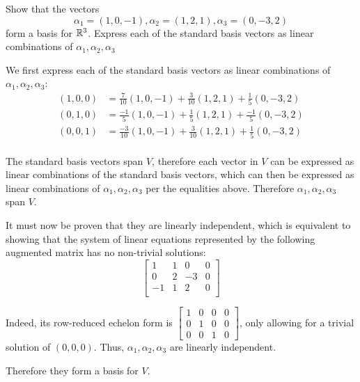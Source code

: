 \documentclass[a4paper, 11pt]{article}
\begin{document}
\begin{problem} 
Show that the vectors \[
    \alpha_1 = (1, 0, -1), \alpha_2 = (1, 2, 1), \alpha_3 = (0, -3, 2)
\]
form a basis for \(\mathbb{R}^3\). Express each of the standard basis vectors as linear combinations of \(\alpha_1, \alpha_2, \alpha_3\)
\end{problem}
\begin{solution}
    We first express each of the standard basis vectors as linear combinations of \(\alpha_1, \alpha_2, \alpha_3\):
    \begin{align*}
        (1, 0, 0) & = \frac{7}{10} (1, 0, -1) + \frac{3}{10} (1, 2, 1) + \frac{1}{5} (0, -3, 2)  \\
        (0, 1, 0) & = \frac{-1}{5} (1, 0, -1) + \frac{1}{5} (1, 2, 1) + \frac{-1}{5} (0, -3, 2)  \\
        (0, 0, 1) & = \frac{-3}{10} (1, 0, -1) + \frac{3}{10} (1, 2, 1) + \frac{1}{5} (0, -3, 2) \\
    \end{align*}

    The standard basis vectors span \(V\), therefore each vector in \(V\) can be expressed as linear combinations of the standard basis vectors, which can then be expressed as linear combinations of \(\alpha_1, \alpha_2, \alpha_3\) per the equalities above. Therefore \(\alpha_1, \alpha_2, \alpha_3\) span \(V\).

    It must now be proven that they are linearly independent, which is equivalent to showing that the system of linear equations represented by the following augmented matrix has no non-trivial solutions:
    \[
        \left[\begin{array}{ccc|c}
                1  & 1 & 0  & 0 \\
                0  & 2 & -3 & 0 \\
                -1 & 1 & 2  & 0 \\
            \end{array}\right]
    \]

    Indeed, its row-reduced echelon form is \(\left[\begin{array}{ccc|c}
            1 & 0 & 0 & 0 \\
            0 & 1 & 0 & 0 \\
            0 & 0 & 1 & 0
        \end{array}\right]\), only allowing for a trivial solution of \((0, 0, 0)\). Thus, \(\alpha_1, \alpha_2, \alpha_3\) are linearly independent.

    Therefore they form a basis for \(V\).
\end{solution}
\end{document}
